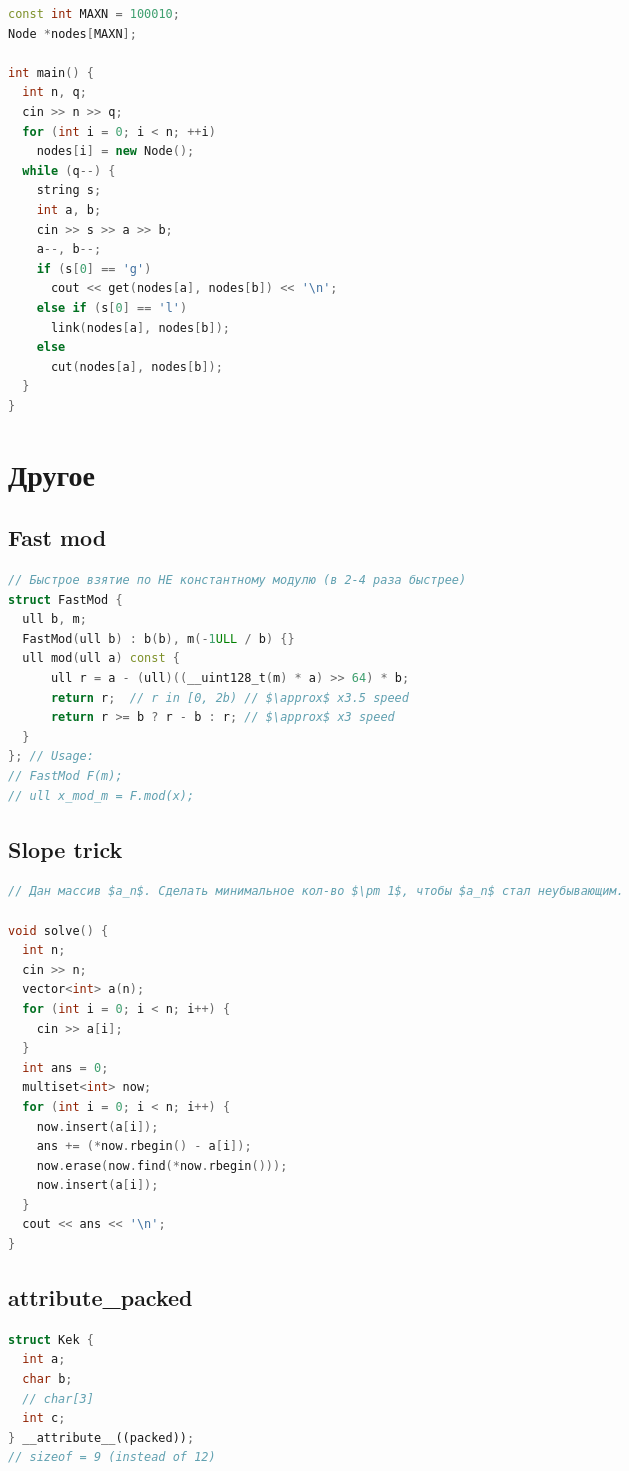 \documentclass[9pt,a4paper,landscape,twosided]{extarticle}
\begin{document}
\begin{multicols*}{3}
\begin{lstlisting}[language=C++]
const int MAXN = 100010;
Node *nodes[MAXN];

int main() {
  int n, q;
  cin >> n >> q;
  for (int i = 0; i < n; ++i)
    nodes[i] = new Node();
  while (q--) {
    string s;
    int a, b;
    cin >> s >> a >> b;
    a--, b--;
    if (s[0] == 'g')
      cout << get(nodes[a], nodes[b]) << '\n';
    else if (s[0] == 'l')
      link(nodes[a], nodes[b]);
    else
      cut(nodes[a], nodes[b]);
  }
}

\end{lstlisting}

\section{Другое}

\subsection{Fast mod}
\begin{lstlisting}[language=C++]
// Быстрое взятие по НЕ константному модулю (в 2-4 раза быстрее)
struct FastMod {
  ull b, m;
  FastMod(ull b) : b(b), m(-1ULL / b) {}
  ull mod(ull a) const {
      ull r = a - (ull)((__uint128_t(m) * a) >> 64) * b;
      return r;  // r in [0, 2b) // $\approx$ x3.5 speed
      return r >= b ? r - b : r; // $\approx$ x3 speed
  }
}; // Usage:
// FastMod F(m);
// ull x_mod_m = F.mod(x);
\end{lstlisting}

\subsection{Slope trick}
\begin{lstlisting}[language=C++]
// Дан массив $a_n$. Сделать минимальное кол-во $\pm 1$, чтобы $a_n$ стал неубывающим.

void solve() {
  int n;
  cin >> n;
  vector<int> a(n);
  for (int i = 0; i < n; i++) {
    cin >> a[i];
  }
  int ans = 0;
  multiset<int> now;
  for (int i = 0; i < n; i++) {
    now.insert(a[i]);
    ans += (*now.rbegin() - a[i]);
    now.erase(now.find(*now.rbegin()));
    now.insert(a[i]);
  }
  cout << ans << '\n';
}
\end{lstlisting}

\subsection{attribute\_packed}
\begin{lstlisting}[language=C++]
struct Kek {
  int a;
  char b;
  // char[3]
  int c;
} __attribute__((packed));
// sizeof = 9 (instead of 12)
\end{lstlisting}


\end{multicols*}
\end{document}
